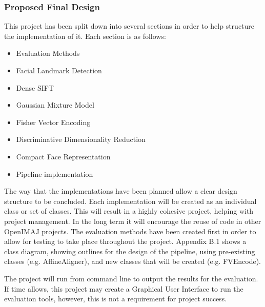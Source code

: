 \documentclass[12pt, a4paper]{article}
\begin{document}
\subsubsection{Proposed Final Design}
This project has been split down into several sections in order to help structure the implementation of it. Each section is as follows:
\begin{itemize}
\item Evaluation Methods
\item Facial Landmark Detection
\item Dense SIFT
\item Gaussian Mixture Model
\item Fisher Vector Encoding
\item Discriminative Dimensionality Reduction
\item Compact Face Representation
\item Pipeline implementation
\end{itemize}
The way that the implementations have been planned allow a clear design structure to be concluded. Each implementation will be created as an individual class or set of classes. This will result in a highly cohesive project, helping with project management. In the long term it will encourage the reuse of code in other OpenIMAJ projects. The evaluation methods have been created first in order to allow for testing to take place throughout the project. Appendix B.1 shows a class diagram, showing outlines for the design of the pipeline, using pre-existing classes (e.g. AffineAligner), and new classes that will be created (e.g. FVEncode).

The project will run from command line to output the results for the evaluation. If time allows, this project may create a Graphical User Interface to run the evaluation tools, however, this is not a requirement for project success.
\end{document}

